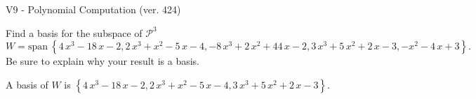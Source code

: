\begin{exercise}
  \begin{exerciseTitle}V9 - Polynomial Computation (ver. 424)\end{exerciseTitle}
  \begin{exerciseStatement}
    Find a basis for the subspace of \(\mathcal{P}^3\) 
\[W=\mathrm{span}\ \left\{4 \, x^{3} - 18 \, x - 2 , 2 \, x^{3} + x^{2} - 5 \, x - 4 , -8 \, x^{3} + 2 \, x^{2} + 44 \, x - 2 , 3 \, x^{3} + 5 \, x^{2} + 2 \, x - 3 , -x^{2} - 4 \, x + 3\right\}.\]
 Be sure to explain why your result is a basis.


  \end{exerciseStatement}
  \begin{exerciseAnswer}
   A basis of \(W\) is  \(\left\{4 \, x^{3} - 18 \, x - 2 , 2 \, x^{3} + x^{2} - 5 \, x - 4 , 3 \, x^{3} + 5 \, x^{2} + 2 \, x - 3\right\}\).
  


  \end{exerciseAnswer}
\end{exercise}